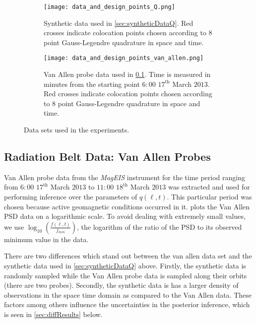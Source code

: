 \begin{figure*}[!htb]
  \centering
  \begin{subfigure}[b]{0.75\textwidth}
    \centering
    \texttt{[image: data\_and\_design\_points\_Q.png]}
    \caption{{\small 
      Synthetic data used in \cref{sec:syntheticDataQ}.
      Red crosses indicate colocation points chosen according to $8$ point Gauss-Legendre 
      quadrature in space and time. 
    }}
  \label{fig:trainingDataQ}
  \end{subfigure}
  \hfill
  \begin{subfigure}[b]{0.75\textwidth}
    \centering
    \texttt{[image: data\_and\_design\_points\_van\_allen.png]}
    \caption{{\small 
      Van Allen probe data used in \cref{sec:vanAllenData}. Time is measured in minutes 
      from the starting point $6:00$ $17^{\text{th}}$ March $2013$. Red crosses indicate 
      colocation points chosen according to $8$ point Gauss-Legendre quadrature in space and time.
    }}
    \label{fig:trainingDataVanAllen} 
  \end{subfigure} 
  \caption{Data sets used in the experiments.}
\end{figure*}

\subsection{Radiation Belt Data: Van Allen Probes}\label{sec:vanAllenData}

Van Allen probe data from the \emph{MagEIS} instrument for the time period ranging from 
$6:00$ $17^{\text{th}}$ March $2013$ to $11:00$ $18^{\text{th}}$ March $2013$ was extracted and 
used for performing inference over the parameters of $q(\ell, t)$. This particular period was 
chosen because active geomagnetic conditions occurred in it.  
plots the Van Allen PSD data on a logarithmic scale. To avoid dealing with extremely small values, 
we use $\log_{10}\left( \frac{f(\ell, t)}{f_{min}} \right)$, the logarithm of the ratio of the PSD 
to its observed minimum value in the data. 

There are two differences which stand out between the van allen data set and the synthetic data 
used in \cref{sec:syntheticDataQ} above. Firstly, the synthetic data is randomly sampled 
while the Van Allen probe data is sampled along their orbits (there are two probes). Secondly, 
the synthetic data is has a larger density of observations in the space time domain as compared to 
the Van Allen data. These factors among others influence the uncertainties in the posterior 
inference, which is seen in \cref{sec:diffResults} below.  

